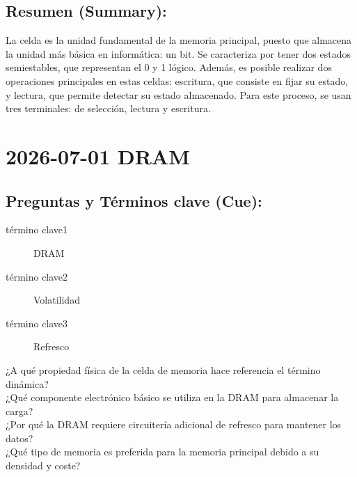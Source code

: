 \documentclass{article}
\begin{document}
\subsection{Resumen (Summary):}
\label{sec:org8b162db}
La celda es la unidad fundamental de la memoria principal, puesto que
almacena la unidad más básica en informática: un bit. Se caracteriza
por tener dos  estados semiestables, que representan el 0 y 1
lógico. Además, es posible realizar dos operaciones principales en
estas celdas: escritura, que consiste en fijar su estado, y lectura,
que permite detectar su estado almacenado. Para este proceso, se usan
tres terminales: de selección, lectura y escritura.

\section{2026-07-01 DRAM}
\label{sec:org2e5da84}

\subsection{Preguntas y Términos clave (Cue):}
\label{sec:orgba4fb24}
\begin{description}
\item[{término clave1}] DRAM
\item[{término clave2}] Volatilidad
\item[{término clave3}] Refresco
\item[{¿A qué propiedad física de la celda de memoria hace referencia el término dinámica?}] 

\item[{¿Qué componente electrónico básico se utiliza en la DRAM para almacenar la carga?}] 

\item[{¿Por qué la DRAM requiere circuitería adicional de refresco para mantener los datos?}] 

\item[{¿Qué tipo de memoria es preferida para la memoria principal debido a su densidad y coste?}] 
\end{description}
\end{document}
